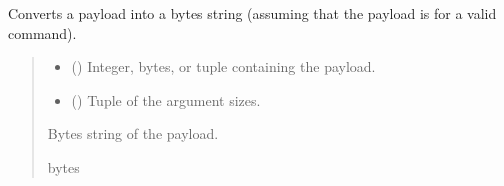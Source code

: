 \documentclass[letterpaper,10pt,english]{sphinxmanual}
\begin{document}
\begin{fulllineitems}

\begin{fulllineitems}
\label{\detokenize{PodApi.Devices:PodApi.Devices.BasicPodProtocol.Pod.PayloadToBytes}}
\pysigstartsignatures
{}
\pysigstopsignatures
\sphinxAtStartPar
Converts a payload into a bytes string (assuming that the payload is for a valid command).
\begin{quote}\begin{description}
\begin{itemize}
\item {} 
\sphinxAtStartPar
{} (\sphinxstyleliteralemphasis{\sphinxupquote{ | }}\sphinxstyleliteralemphasis{\sphinxupquote{ | }}\sphinxstyleliteralemphasis{\sphinxupquote{{[}}}\sphinxstyleliteralemphasis{\sphinxupquote{ | }}\sphinxstyleliteralemphasis{\sphinxupquote{{]}}}) \textendash{} Integer, bytes, or tuple containing the payload.

\item {} 
\sphinxAtStartPar
{} (\sphinxstyleliteralemphasis{\sphinxupquote{{[}}}\sphinxstyleliteralemphasis{\sphinxupquote{{]}}}) \textendash{} Tuple of the argument sizes.

\end{itemize}

\sphinxAtStartPar
Bytes string of the payload.

\sphinxAtStartPar
bytes


\end{description}
\end{quote}
\end{fulllineitems}
\end{fulllineitems}
\end{document}
